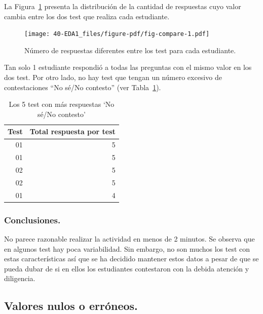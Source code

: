 \documentclass[
  12pt,
  a4paper,
  extrafontsizes,
  onecolumn,
  openright]{memoir}
\begin{document}
La Figura~\ref{fig-compare} presenta la distribución de la cantidad de
respuestas cuyo valor cambia entre los dos test que realiza cada
estudiante.

\begin{figure}[h]

{\centering \texttt{[image: 40-EDA1\_files/figure-pdf/fig-compare-1.pdf]}

}

\caption{\label{fig-compare}Número de respuestas diferentes entre los
test para cada estudiante.}

\end{figure}

\clearpage

Tan solo 1 estudiante respondió a todas las preguntas con el mismo valor
en los dos test. Por otro lado, no hay test que tengan un número
excesivo de contestaciones \enquote{No sé/No contesto} (ver
Tabla~\ref{tbl-noanswer}).

\hypertarget{tbl-noanswer}{}
\begin{longtable}{rr}
\caption{\label{tbl-noanswer}Los 5 test con más respuestas `No sé/No contesto' }\tabularnewline

\toprule
Test & Total respuesta por test \\ 
\midrule
01 & 5 \\ 
01 & 5 \\ 
02 & 5 \\ 
02 & 5 \\ 
01 & 4 \\ 
\bottomrule
\end{longtable}

\hypertarget{conclusiones.}{%
\subsubsection{Conclusiones.}\label{conclusiones.}}

No parece razonable realizar la actividad en menos de 2 minutos. Se
observa que en algunos test hay poca variabilidad. Sin embargo, no son
muchos los test con estas características así que se ha decidido
mantener estos datos a pesar de que se pueda dubar de si en ellos los
estudiantes contestaron con la debida atención y diligencia.

\hypertarget{valores-nulos-o-erruxf3neos.}{%
\subsection{Valores nulos o
erróneos.}\label{valores-nulos-o-erruxf3neos.}}
\end{document}
